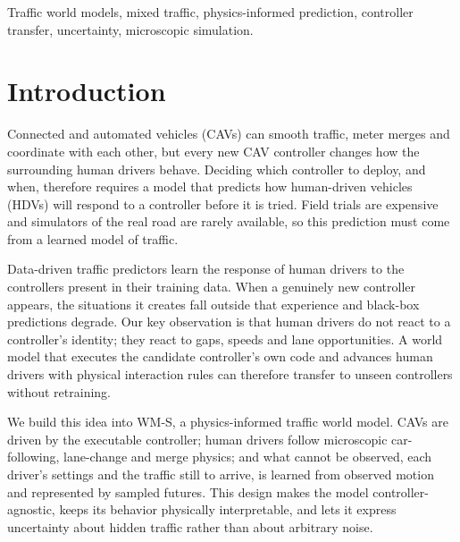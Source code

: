 \documentclass[conference]{IEEEtran}
\begin{document}
\begin{IEEEkeywords}
Traffic world models, mixed traffic, physics-informed prediction, controller transfer, uncertainty, microscopic simulation.
\end{IEEEkeywords}

\section{Introduction}
Connected and automated vehicles (CAVs) can smooth traffic, meter merges and coordinate with each other, but every new CAV controller changes how the surrounding human drivers behave. Deciding which controller to deploy, and when, therefore requires a model that predicts how human-driven vehicles (HDVs) will respond to a controller before it is tried. Field trials are expensive and simulators of the real road are rarely available, so this prediction must come from a learned model of traffic.

Data-driven traffic predictors learn the response of human drivers to the controllers present in their training data. When a genuinely new controller appears, the situations it creates fall outside that experience and black-box predictions degrade. Our key observation is that human drivers do not react to a controller's identity; they react to gaps, speeds and lane opportunities. A world model that executes the candidate controller's own code and advances human drivers with physical interaction rules can therefore transfer to unseen controllers without retraining.

We build this idea into WM-S, a physics-informed traffic world model. CAVs are driven by the executable controller; human drivers follow microscopic car-following, lane-change and merge physics; and what cannot be observed, each driver's settings and the traffic still to arrive, is learned from observed motion and represented by sampled futures. This design makes the model controller-agnostic, keeps its behavior physically interpretable, and lets it express uncertainty about hidden traffic rather than about arbitrary noise.
\end{document}
